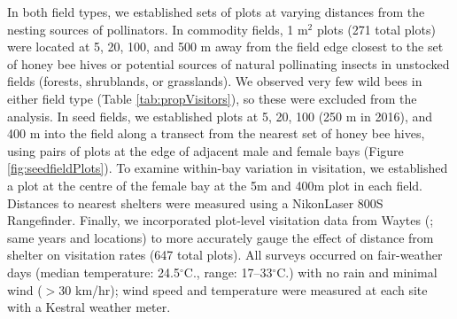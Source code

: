 \documentclass[12pt]{article} %
\begin{document}

In both field types, we established sets of plots at varying distances from the nesting sources of pollinators. 
In commodity fields, 1 m$^2$ plots (271 total plots) were located at 5, 20, 100, and 500 m away from the field edge closest to the set of honey bee hives or potential sources of natural pollinating insects in unstocked fields (forests, shrublands, or grasslands). 
We observed very few wild bees in either field type (Table \ref{tab:propVisitors}), so these were excluded from the analysis.
In seed fields, we established plots at 5, 20, 100 (250 m in 2016), and 400 m into the field along a transect from the nearest set of honey bee hives, using pairs of plots at the edge of adjacent male and female bays (Figure \ref{fig:seedfieldPlots}).
To examine within-bay variation in visitation, we established a plot at the centre of the female bay at the 5m and 400m plot in each field. 
Distances to nearest shelters were measured using a Nikon\texttrademark Laser 800S Rangefinder.
Finally, we incorporated plot-level visitation data from Waytes (\citeyear{waytes2022}; same years and locations) to more accurately gauge the effect of distance from shelter on visitation rates (647 total plots).
All surveys occurred on fair-weather days (median temperature: 24.5$^\circ$C., range: 17--33$^\circ$C.) with no rain and minimal wind ($>$30 km/hr); wind speed and temperature were measured at each site with a Kestral weather meter.
\end{document}
